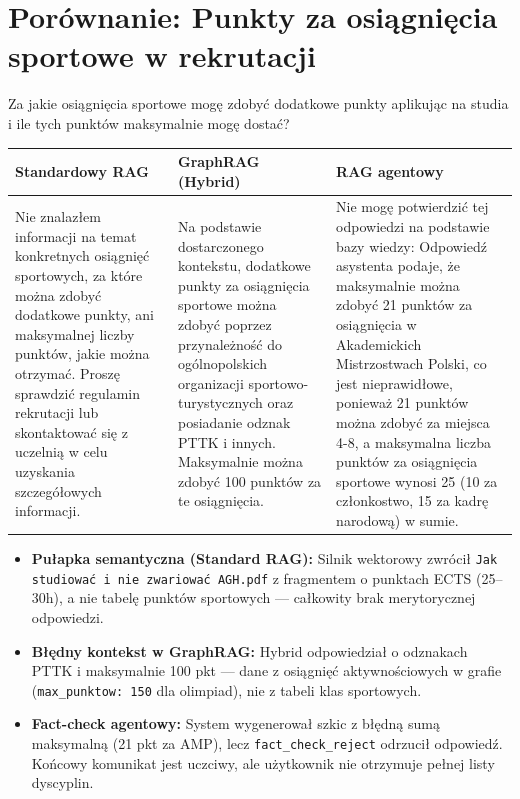 \newpage
\section*{Porównanie: Punkty za osiągnięcia sportowe w rekrutacji}

\begin{tcolorbox}[colback=blue!5!white,colframe=blue!75!black,title=Pytanie użytkownika]
    Za jakie osiągnięcia sportowe mogę zdobyć dodatkowe punkty aplikując na studia i ile tych punktów maksymalnie mogę dostać?
\end{tcolorbox}

\noindent
\begin{tabularx}{\textwidth}{@{} >{\raggedright\arraybackslash}X >{\raggedright\arraybackslash}X >{\raggedright\arraybackslash}X @{}}
    \toprule
    \textbf{Standardowy RAG} & \textbf{GraphRAG (Hybrid)} & \textbf{RAG agentowy} \\
    \midrule
    \footnotesize Nie znalazłem informacji na temat konkretnych osiągnięć sportowych, za które można zdobyć dodatkowe punkty, ani maksymalnej liczby punktów, jakie można otrzymać. Proszę sprawdzić regulamin rekrutacji lub skontaktować się z uczelnią w celu uzyskania szczegółowych informacji. & \footnotesize Na podstawie dostarczonego kontekstu, dodatkowe punkty za osiągnięcia sportowe można zdobyć poprzez przynależność do ogólnopolskich organizacji sportowo-turystycznych oraz posiadanie odznak PTTK i innych. Maksymalnie można zdobyć 100 punktów za te osiągnięcia. & \footnotesize Nie mogę potwierdzić tej odpowiedzi na podstawie bazy wiedzy: Odpowiedź asystenta podaje, że maksymalnie można zdobyć 21 punktów za osiągnięcia w Akademickich Mistrzostwach Polski, co jest nieprawidłowe, ponieważ 21 punktów można zdobyć za miejsca 4-8, a maksymalna liczba punktów za osiągnięcia sportowe wynosi 25 (10 za członkostwo, 15 za kadrę narodową) w sumie. \\
    \bottomrule
\end{tabularx}

\begin{tcolorbox}[colback=red!5!white,colframe=red!50!black,title=Wnioski i obserwacje]
    \begin{itemize}
        \item \textbf{Pułapka semantyczna (Standard RAG):} Silnik wektorowy zwrócił \texttt{Jak studiować i nie zwariować AGH.pdf} z fragmentem o punktach ECTS (25--30h), a nie tabelę punktów sportowych --- całkowity brak merytorycznej odpowiedzi.
        \item \textbf{Błędny kontekst w GraphRAG:} Hybrid odpowiedział o odznakach PTTK i maksymalnie 100 pkt --- dane z osiągnięć aktywnościowych w grafie (\texttt{max\_punktow: 150} dla olimpiad), nie z tabeli klas sportowych.
        \item \textbf{Fact-check agentowy:} System wygenerował szkic z błędną sumą maksymalną (21 pkt za AMP), lecz \texttt{fact\_check\_reject} odrzucił odpowiedź. Końcowy komunikat jest uczciwy, ale użytkownik nie otrzymuje pełnej listy dyscyplin.
    \end{itemize}
\end{tcolorbox}
\vspace{1em}

